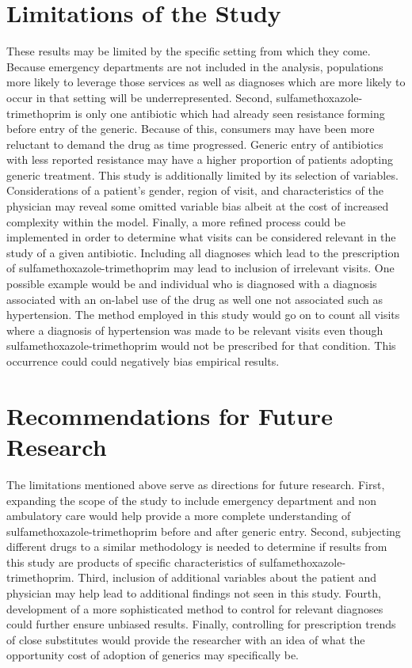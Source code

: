 \section{Limitations of the Study}
These results may be limited by the specific setting from which they come. Because emergency departments are not included in the analysis, populations more likely to leverage those services as well as diagnoses which are more likely to occur in that setting will be underrepresented. Second, sulfamethoxazole-trimethoprim is only one antibiotic which had already seen resistance forming before entry of the generic. Because of this, consumers may have been more reluctant to demand the drug as time progressed. Generic entry of antibiotics with less reported resistance may have a higher proportion of patients adopting generic treatment. This study is additionally limited by its selection of variables. Considerations of a patient's gender, region of visit, and characteristics of the physician may reveal some omitted variable bias albeit at the cost of increased complexity within the model. Finally, a more refined process could be implemented in order to determine what visits can be considered relevant in the study of a given antibiotic. Including all diagnoses which lead         to the prescription of sulfamethoxazole-trimethoprim may lead to inclusion of irrelevant visits. One possible example would be and individual who is diagnosed with a diagnosis associated with an on-label use of the drug as well one not associated such as hypertension. The method employed in this study would go on to count all visits where a diagnosis of hypertension was made to be relevant visits even though sulfamethoxazole-trimethoprim would not be prescribed for that condition. This occurrence could could negatively bias empirical results. 

\section{Recommendations for Future Research}
The limitations mentioned above serve as directions for future research. First, expanding the scope of the study to include emergency department and non ambulatory care would help provide a more complete understanding of sulfamethoxazole-trimethoprim before and after generic entry. Second, subjecting different drugs to a similar methodology is needed to determine if results from this study are products of specific characteristics of sulfamethoxazole-trimethoprim. Third, inclusion of additional variables about the patient and physician may help lead to additional findings not seen in this study. Fourth, development of a more sophisticated method to control for relevant diagnoses could further ensure unbiased results. Finally, controlling for prescription trends of close substitutes would provide the researcher with an idea of what the opportunity cost of adoption of generics may specifically be. 